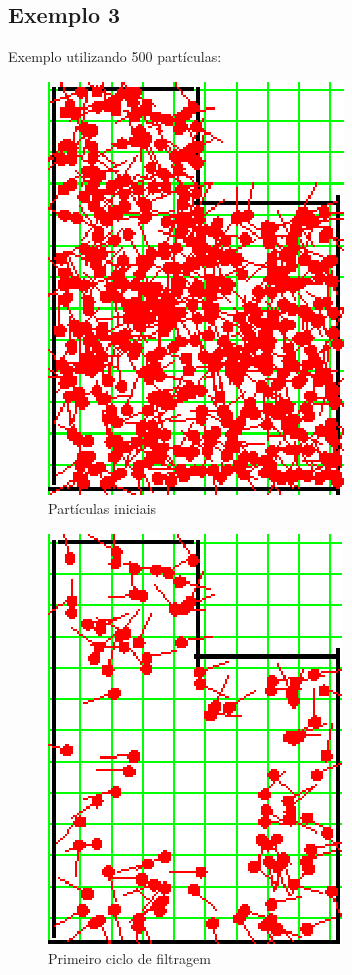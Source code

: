 \subsection{Exemplo 3}

Exemplo utilizando 500 partículas:

\begin{figure}[H]
  \centering
  \includegraphics[scale=1]{figuras/cen1_ex3/1.eps}
  \caption[Partículas Iniciais]{Partículas iniciais}
  \label{img:cen1_ex3_1}
\end{figure}

\begin{figure}[H]
  \centering
  \includegraphics[scale=1]{figuras/cen1_ex3/2.eps}
  \caption[Primeiro Ciclo de Filtragem]{Primeiro ciclo de filtragem}
  \label{img:cen1_ex3_2}
\end{figure}

